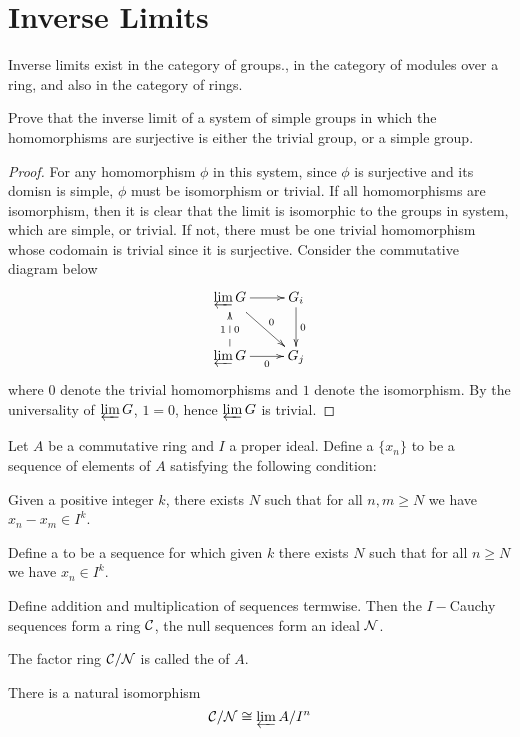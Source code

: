 \newpage\section{Inverse Limits}

  \begin{thm}
    Inverse limits exist in the category of groups., in the category of modules over a ring, and also in the category of rings.
  \end{thm}

  \begin{ex}
    Prove that the inverse limit of a system of simple groups in which the homomorphisms are surjective is either the trivial group, or a simple group.
  \end{ex}
  \begin{proof}
    For any homomorphism $\phi$ in this system, since $\phi$ is surjective and its domisn is simple, $\phi$ must be isomorphism or trivial. If all homomorphisms are isomorphism, then it is clear that the limit is isomorphic to the groups in system, which are simple, or trivial.
    If not, there must be one trivial homomorphism whose codomain is trivial since it is surjective. Consider the commutative diagram below
        \begin{displaymath}
          \xymatrix{
             \invlim G\ar[r]\ar[dr]^-{0} & G_i\ar[d]^{0}               \\
             \invlim G\ar[r]_-{0}\ar@{-->}[u]^-{1}_-{0} & G_j }
        \end{displaymath}
    where $0$ denote the trivial homomorphisms and $1$ denote the isomorphism. By the universality of $\operatorname*{\underleftarrow{\lim}} G$, $1=0$, hence $\operatorname*{\underleftarrow{\lim}} G$ is trivial.
  \end{proof}

  \begin{defn}
    Let $A$ be a commutative ring and $I$ a proper ideal. Define a  $\{x_n\}$ to be a sequence of elements of $A$ satisfying the following condition:

    Given a positive integer $k$, there exists $N$ such that for all $n,m\geqslant N$ we have $x_n-x_m\in I^k$.

    Define a  to be a sequence for which given $k$ there exists $N$ such that for all $n\geqslant N$ we have $x_n\in I^k$.
  \end{defn}
  \begin{prop}
    Define addition and multiplication of sequences termwise. Then the $I-$Cauchy sequences form a ring ${\cal C}$, the null sequences form an ideal ${\cal N}$.
  \end{prop}
  \begin{defn}
    The factor ring ${\cal C}/{\cal N}$ is called the  of $A$.
  \end{defn}
  \begin{prop}
    There is a natural isomorphism
    \begin{equation*}
      {\cal C}/{\cal N} \cong \operatorname*{\underleftarrow{\lim}} A/I^n
    \end{equation*}
  \end{prop}

